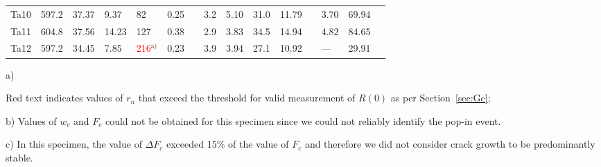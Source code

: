 \documentclass[12pt,onecolumn]{article}
\begin{document}
\begin{landscape}
\begin{table}
\begin{threeparttable}
\begin{tabular}{rllllllllllllll}
Ta10 & 597.2 & 37.37 & 9.37 &   82 & 0.25 &  &  3.2 & 5.10 & 31.0 & 11.79 &  & 3.70 &69.94 \\ 
Ta11 & 604.8 & 37.56 & 14.23 &  127 & 0.38 &  &  2.9 & 3.83 & 34.5 & 14.94 &  & 4.82 &84.65 \\ 
Ta12 & 597.2 & 34.45 & 7.85 &  \textcolor{red}{216}$^\text{a)}$ & 0.23 &  &  3.9 & 3.94 & 27.1 & 10.92 &  & --- &29.91 \\ 
\bottomrule
\end{tabular}
\begin{tablenotes}
\item[a)] {\footnotesize Red text indicates values of $r_n$ that exceed the threshold for valid measurement of $R(0)$ as per Section~\ref{sec:Gc};
\item[b)] Values of $w_c$ and $F_c$ could not be obtained for this specimen since we could not reliably identify the pop-in event.
\item[c)] In this specimen, the value of $\Delta F_c$ exceeded 15\% of the value of $F_c$ and therefore we did not consider crack growth to be predominantly stable.}
\end{tablenotes}
\end{threeparttable}
\end{table}

\end{landscape}
\restoregeometry
\end{document}
